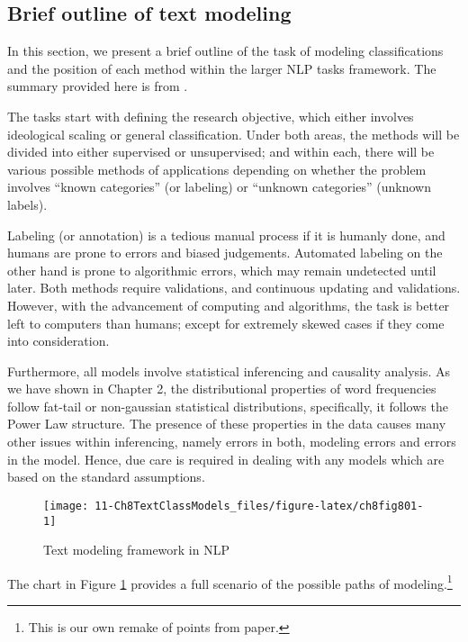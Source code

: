 \documentclass[
]{article}
\begin{document}
\hypertarget{brief-outline-of-text-modeling}{%
\subsection{Brief outline of text modeling}\label{brief-outline-of-text-modeling}}

In this section, we present a brief outline of the task of modeling classifications and the position of each method within the larger NLP tasks framework. The summary provided here is from \citep{grimmer2013}.

The tasks start with defining the research objective, which either involves ideological scaling or general classification. Under both areas, the methods will be divided into either supervised or unsupervised; and within each, there will be various possible methods of applications depending on whether the problem involves ``known categories'' (or labeling) or ``unknown categories'' (unknown labels).

Labeling (or annotation) is a tedious manual process if it is humanly done, and humans are prone to errors and biased judgements. Automated labeling on the other hand is prone to algorithmic errors, which may remain undetected until later. Both methods require validations, and continuous updating and validations. However, with the advancement of computing and algorithms, the task is better left to computers than humans; except for extremely skewed cases if they come into consideration.

Furthermore, all models involve statistical inferencing and causality analysis. As we have shown in Chapter 2, the distributional properties of word frequencies follow fat-tail or non-gaussian statistical distributions, specifically, it follows the Power Law structure. The presence of these properties in the data causes many other issues within inferencing, namely errors in both, modeling errors and errors in the model. Hence, due care is required in dealing with any models which are based on the standard assumptions.

\begin{figure}

{\centering \texttt{[image: 11-Ch8TextClassModels\_files/figure-latex/ch8fig801-1]} 

}

\caption{Text modeling framework in NLP}\label{fig:ch8fig801}
\end{figure}

The chart in Figure \ref{fig:ch8fig801} provides a full scenario of the possible paths of modeling.\footnote{This is our own remake of points from \citep{grimmer2013} paper.}
\end{document}

